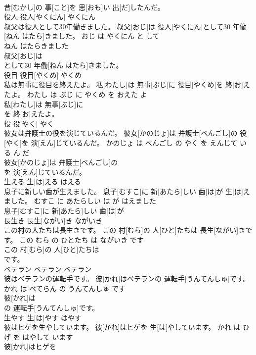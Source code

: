 \documentclass[8pt]{extreport}
\begin{document}
\begin{CJK}{UTF8}{min}
\\	昔[むかし]の 事[こと]を 思[おも]い 出[だ]したんだ。			
\\	役人	役人[やくにん]	やくにん	
\\	叔父は役人として30年働きました。	叔父[おじ]は 役人[やくにん]として30 年働[ねん はたら]きました。	おじ は やくにん と して 
\\	ねん はたらきました	
\\	叔父[おじ]は
\\	として30 年働[ねん はたら]きました。			
\\	役目	役目[やくめ]	やくめ	
\\	私は無事に役目を終えたよ。	私[わたし]は 無事[ぶじ]に 役目[やくめ]を 終[お]えたよ。	わたし は ぶじ に やくめ を おえた よ	
\\	私[わたし]は 無事[ぶじ]に
\\	を 終[お]えたよ。			
\\	役	役[やく]	やく	
\\	彼女は弁護士の役を演じているんだ。	彼女[かのじょ]は 弁護士[べんごし]の 役[やく]を 演[えん]じているんだ。	かのじょ は べんごし の やく を えんじて いる ん だ	
\\	彼女[かのじょ]は 弁護士[べんごし]の
\\	を 演[えん]じているんだ。			
\\	生える	生[は]える	はえる	
\\	息子に新しい歯が生えました。	息子[むすこ]に 新[あたら]しい 歯[は]が 生[は]えました。	むすこ に あたらしい は が はえました	
\\	息子[むすこ]に 新[あたら]しい 歯[は]が
\\	長生き	長生[ながい]き	ながいき	
\\	この村の人たちは長生きです。	この 村[むら]の 人[ひと]たちは 長生[ながい]きです。	この むら の ひとたち は ながいき です	
\\	この 村[むら]の 人[ひと]たちは
\\	です。			
\\	ベテラン	ベテラン	ベテラン	
\\	彼はベテランの運転手です。	彼[かれ]はベテランの 運転手[うんてんしゅ]です。	かれ は べてらん の うんてんしゅ です	
\\	彼[かれ]は
\\	の 運転手[うんてんしゅ]です。			
\\	生やす	生[は]やす	はやす	
\\	彼はヒゲを生やしています。	彼[かれ]はヒゲを 生[は]やしています。	かれ は ひげ を はやして います	
\\	彼[かれ]はヒゲを

\end{CJK}
\end{document}
